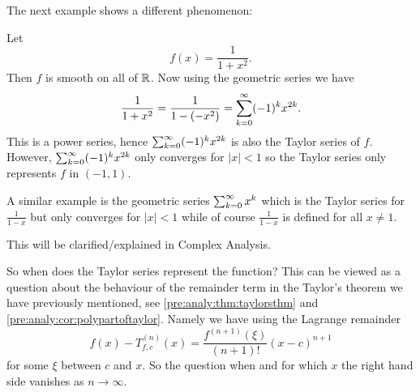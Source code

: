 \documentclass[10pt, a4paper]{article}
\newcommand{\infsumo}{\infsum[k = 0]}
\begin{document}
The next example shows a different phenomenon:
\begin{example}
    Let
    \[
    f(x) = \frac{1}{1 + x ^ 2}.
    \]
    Then $f$ is smooth on all of $\mathbb{R}$.
    Now using the geometric series we have
    \[
    \frac{1}{1 + x ^ 2} = \frac{1}{1 - (-x ^ 2)} = \infsumo(-1) ^ kx ^ {2k}.
    \]
    This is a power series,
    hence $\infsumo(-1) ^ k x ^ {2k}$ is also the Taylor series of $f$.
    However,
    $\infsumo(-1) ^ kx ^ {2k}$ only converges for $|x| < 1$ so the Taylor series only represents $f$ in $(-1, 1)$.

    A similar example is the geometric series $\infsumo x ^ k$ which is the Taylor series for $\frac{1}{1 - x}$ but only converges for $|x| < 1$ while of course $\frac{1}{1 - x}$ is defined for all $x \neq 1$.

    This will be clarified/explained in Complex Analysis.
\end{example}

So when does the Taylor series represent the function?
This can be viewed as a question about the behaviour of the remainder term in the Taylor's theorem we have previously mentioned,
see \autoref{pre:analy:thm:taylorsthm} and \autoref{pre:analy:cor:polypartoftaylor}.
Namely we have using the Lagrange remainder
\[
f(x) - T_{f, c} ^ {(n)}(x) = \frac{f ^ {(n + 1)}(\xi)}{(n + 1)!}(x - c) ^ {n + 1}
\]
for some $\xi$ between $c$ and $x$.
So the question when and for which $x$ the right hand side vanishes as $n \rightarrow \infty$.
\end{document}
